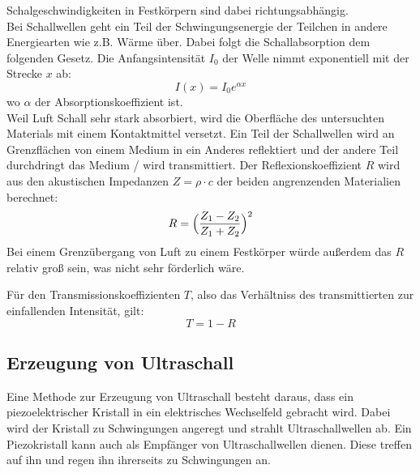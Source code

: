 \documentclass[titlepage = firstcover]{scrartcl}
\begin{document}
        Schalgeschwindigkeiten in Festkörpern sind dabei richtungsabhängig. \\

        Bei Schallwellen geht ein Teil der Schwingungsenergie der Teilchen in andere Energiearten wie z.B. Wärme über.
        Dabei folgt die Schallabsorption dem folgenden Gesetz. Die Anfangsintensität $I_0$ der Welle nimmt exponentiell mit der Strecke $x$ ab:
        \begin{equation*}
          I(x) = I_0 e^{\alpha x}
        \end{equation*}
        wo $\alpha$ der Absorptionskoeffizient ist. \\

        Weil Luft Schall sehr stark absorbiert, wird die Oberfläche des untersuchten Materials mit einem Kontaktmittel versetzt. Ein Teil der Schallwellen wird an Grenzflächen von einem Medium in ein Anderes reflektiert und der andere Teil durchdringt das Medium / wird transmittiert. Der Reflexionskoeffizient $R$ wird aus den akustischen Impedanzen $Z = \rho \cdot c$ der beiden angrenzenden Materialien berechnet:
        \begin{equation*}
          R = \Bigl(\frac{Z_1 - Z_2}{Z_1 + Z_2}\Bigr)^2
        \end{equation*}
        Bei einem Grenzübergang von Luft zu einem Festkörper würde außerdem das $R$ relativ groß sein, was nicht sehr förderlich wäre.

        Für den Transmissionskoeffizienten $T$, also das Verhältniss des transmittierten zur einfallenden Intensität, gilt:
        \begin{equation*}
          T = 1 - R
        \end{equation*}

      \subsection{Erzeugung von Ultraschall}
        Eine Methode zur Erzeugung von Ultraschall besteht daraus, dass ein piezoelektrischer Kristall in ein elektrisches Wechselfeld gebracht wird. Dabei wird der Kristall zu Schwingungen angeregt und strahlt Ultraschallwellen ab. Ein Piezokristall kann auch als Empfänger von Ultraschallwellen dienen. Diese treffen auf ihn und regen ihn ihrerseits zu Schwingungen an.
\end{document}

